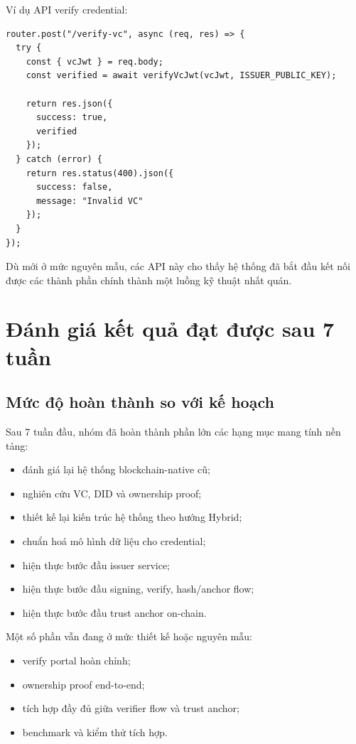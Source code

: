 Ví dụ API verify credential:

\begin{lstlisting}[caption={Route verify credential}, label={lst:verify_route_midterm}]
router.post("/verify-vc", async (req, res) => {
  try {
    const { vcJwt } = req.body;
    const verified = await verifyVcJwt(vcJwt, ISSUER_PUBLIC_KEY);

    return res.json({
      success: true,
      verified
    });
  } catch (error) {
    return res.status(400).json({
      success: false,
      message: "Invalid VC"
    });
  }
});
\end{lstlisting}

Dù mới ở mức nguyên mẫu, các API này cho thấy hệ thống đã bắt đầu kết nối được các thành phần chính thành một luồng kỹ thuật nhất quán.

\section{Đánh giá kết quả đạt được sau 7 tuần}

\subsection{Mức độ hoàn thành so với kế hoạch}

Sau 7 tuần đầu, nhóm đã hoàn thành phần lớn các hạng mục mang tính nền tảng:
\begin{itemize}
    \item đánh giá lại hệ thống blockchain-native cũ;
    \item nghiên cứu VC, DID và ownership proof;
    \item thiết kế lại kiến trúc hệ thống theo hướng Hybrid;
    \item chuẩn hoá mô hình dữ liệu cho credential;
    \item hiện thực bước đầu issuer service;
    \item hiện thực bước đầu signing, verify, hash/anchor flow;
    \item hiện thực bước đầu trust anchor on-chain.
\end{itemize}

Một số phần vẫn đang ở mức thiết kế hoặc nguyên mẫu:
\begin{itemize}
    \item verify portal hoàn chỉnh;
    \item ownership proof end-to-end;
    \item tích hợp đầy đủ giữa verifier flow và trust anchor;
    \item benchmark và kiểm thử tích hợp.
\end{itemize}

